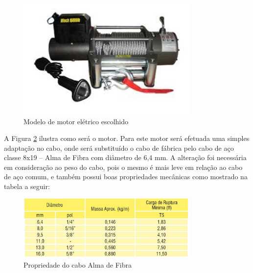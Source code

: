 \begin{figure}[H]
	\centering
	\includegraphics[width=0.8\textwidth]{figuras/modelodemotoreletrico}
	\caption[Modelo de motor elétrico escolhido]{Modelo de motor elétrico escolhido~\cite{bremem}}
	\label{img:motorescolhido}
\end{figure}

A Figura \ref{img:motorescolhido} ilustra como será o motor. Para este motor será efetuada uma simples adaptação no cabo, onde será substituído o cabo de fábrica pelo cabo de aço classe 8x19 – Alma de Fibra com diâmetro de 6,4 mm. A alteração foi necessária em consideração ao peso do cabo, pois o mesmo é mais leve em relação ao cabo de aço comum, e também possui boas propriedades mecânicas como mostrado na tabela a seguir:

\begin{figure}[H]
	\centering
	\includegraphics[width=0.8\textwidth]{figuras/tabelacabo}
	\caption[Propriedade do cabo Alma de Fibra]{Propriedade do cabo Alma de Fibra~\cite{acrocabo}}
	\label{img:motorescolhido}
\end{figure}
